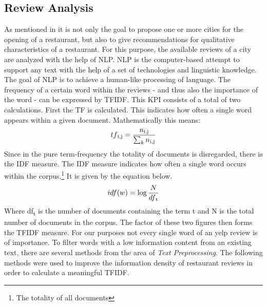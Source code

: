 \subsection{Review Analysis}
\label{subsec:review}
As mentioned in  it is not only the goal to propose one or more cities for the opening of a restaurant,
but also to give recommendations for qualitative characteristics of a restaurant.
\newline
For this purpose, the available reviews of a city are analyzed with the help of \ac{NLP}.
\ac{NLP} is the computer-based attempt to support any text with the help of a set of technologies and linguistic knowledge.\cite{Liddy01}
The goal of \ac{NLP} is to achieve a human-like processing of language.\cite{Liddy01}
The frequency of a certain word within the reviews - and thus also the importance of the word - can be expressed by \ac{TFIDF}.
This \ac{KPI} consists of a total of two calculations.
First the \ac{TF} is calculated.
This indicates how often a single word appears within a given document.
Mathematically this means:
\newline
\begin{equation}
  tf\textsubscript{i,j} = \frac{n\textsubscript{i,j}}{\sum_{k} n\textsubscript{i,j}}
	\label{eq:tf}
\end{equation}
Since in the pure term-frequency the totality of documents is disregarded, there is the \ac{IDF} measure.
The \ac{IDF} measure indicates how often a single word occurs within the corpus.\footnote{The totality of all documents}
It is given by the equation below.
\newline
\begin{equation}
  idf(w) = \log \frac{N}{df\textsubscript{t}}
	\label{eq:tf}
\end{equation}
Where df\textsubscript{t} is the number of documents containing the term t and N is the total number of documents in the corpus.
The factor of these two figures then forms the \ac{TFIDF} measure.\cite{droid18}
\newline
For our purposes not every single word of an yelp review is of importance.
To filter words with a low information content from an existing text, there are several methods from the area of \textit{Text Preprocessing}.
The following methods were used to improve the information density of restaurant reviews in order to calculate a meaningful \ac{TFIDF}.
